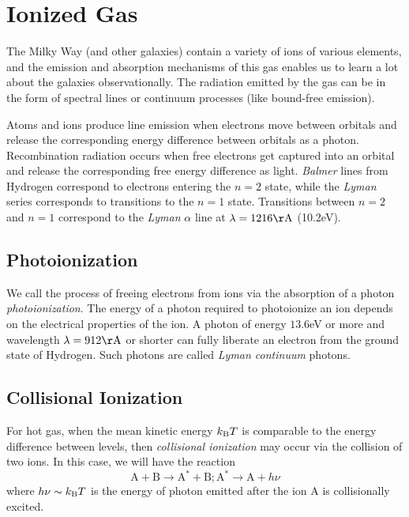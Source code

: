 \documentclass[12pt]{article}
\begin{document}
\section{Ionized Gas}

The Milky Way (and other galaxies) contain a variety of ions of various elements,
and the emission and absorption mechanisms of this gas enables us to learn a lot
about the galaxies observationally. The radiation emitted by the gas can be
in the form of spectral lines or continuum processes (like bound-free emission).

Atoms and ions produce line emission when electrons move between orbitals and
release the corresponding energy difference between orbitals as a photon.
Recombination radiation occurs when free electrons get captured into an orbital
and release the corresponding free energy difference as light. {\it Balmer} lines
from Hydrogen correspond to electrons entering the $n=2$ state, while the {\it Lyman}
series corresponds to transitions to the $n=1$ state. Transitions between $n=2$ and
$n=1$ correspond to the {\it Lyman} $\alpha$ line at $\lambda = 1216\Ang$ (10.2eV). 

\subsection{Photoionization}
We call the process of freeing electrons from ions via the absorption of a photon
{\it photoionization}. The energy of a photon required to photoionize an ion depends
on the electrical properties of the ion.
A photon of
energy $13.6$eV or more and wavelength $\lambda=912\Ang$ or shorter can fully liberate
an electron from the ground state of Hydrogen. Such photons are called {\it Lyman continuum}
photons.

\subsection{Collisional Ionization}

For hot gas, when the mean kinetic energy $k_{\mathrm{B}} T$ is comparable to the energy
difference between levels, then {\it collisional ionization} may occur via the
collision of two ions. In this case, we will have the reaction
\begin{equation}
\mathrm{A}+\mathrm{B}\to \mathrm{A}^{*} + \mathrm{B}; \mathrm{A}^{*} \to \mathrm{A} + h\nu
\end{equation}
\noindent
where $h\nu \sim k_{\mathrm{B}} T$ is the energy of photon emitted after the ion A is collisionally
excited. 
\end{document}
